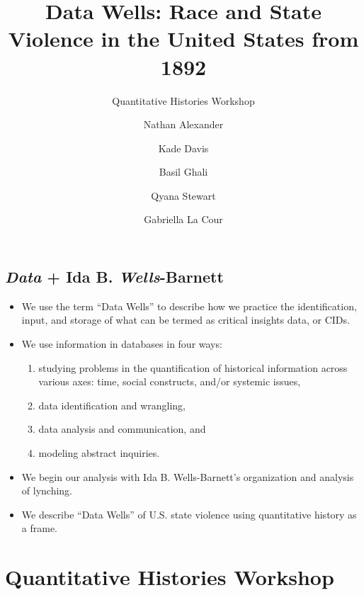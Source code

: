 \documentclass[
  letterpaper,
  DIV=11,
  numbers=noendperiod]{scrartcl}
\title{Data Wells: Race and State Violence in the United States from
1892}
\subtitle{Quantitative Histories Workshop}
\author{Nathan Alexander \and Kade Davis \and Basil Ghali \and Qyana
Stewart \and Gabriella La Cour}
\date{}
\renewcommand*\contentsname{Table of contents}
\newcommand\contentsname{Table of contents}
\begin{document}
\maketitle
\ifdefined\Shaded\renewenvironment{Shaded}{\begin{tcolorbox}[frame hidden, breakable, boxrule=0pt, sharp corners, interior hidden, borderline west={3pt}{0pt}{shadecolor}, enhanced]}{\end{tcolorbox}}\fi

\renewcommand*\contentsname{Table of contents}
{
\hypersetup{linkcolor=}
\setcounter{tocdepth}{3}
\tableofcontents
}
\hypertarget{data-ida-b.-wells-barnett}{%
\subsection{\texorpdfstring{{\emph{Data}} + Ida B.
{\emph{Wells}}-Barnett}{Data + Ida B. Wells-Barnett}}\label{data-ida-b.-wells-barnett}}

\begin{itemize}
\item
  We use the term ``{Data Wells}'' to describe how we practice the
  identification, input, and storage of what can be termed as critical
  insights data, or CIDs.
\item
  We use information in databases in four ways:

  \begin{enumerate}
  \def\labelenumi{(\arabic{enumi})}
  \item
    studying problems in the {quantification of historical information}
    across various axes: time, social constructs, and/or systemic
    issues,
  \item
    data {identification} and {wrangling},
  \item
    data {analysis} and {communication}, and
  \item
    {modeling} abstract inquiries.
  \end{enumerate}
\item
  We begin our analysis with Ida B. Wells-Barnett's organization and
  analysis of lynching.
\item
  We describe ``Data Wells'' of U.S. state violence using quantitative
  history as a frame.
\end{itemize}

\hypertarget{quantitative-histories-workshop}{%
\section{Quantitative Histories
Workshop}\label{quantitative-histories-workshop}}
\end{document}
